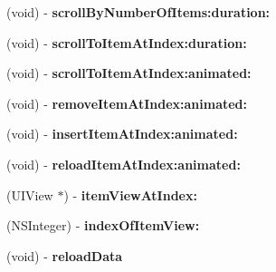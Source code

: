 \begin{DoxyCompactItemize}
\item 
\hypertarget{interfacei_carousel_a70d756ca9733de264576ad1609b0670c}{(void) -\/ {\bfseries scroll\-By\-Number\-Of\-Items\-:duration\-:}}\label{interfacei_carousel_a70d756ca9733de264576ad1609b0670c}

\item 
\hypertarget{interfacei_carousel_a317c3bf4ceb4d0621ee6727dfdd611a1}{(void) -\/ {\bfseries scroll\-To\-Item\-At\-Index\-:duration\-:}}\label{interfacei_carousel_a317c3bf4ceb4d0621ee6727dfdd611a1}

\item 
\hypertarget{interfacei_carousel_abae537074eab49ea3ec5c4cc33b49c12}{(void) -\/ {\bfseries scroll\-To\-Item\-At\-Index\-:animated\-:}}\label{interfacei_carousel_abae537074eab49ea3ec5c4cc33b49c12}

\item 
\hypertarget{interfacei_carousel_a7a5514e7ef0d9eb5ebb453a0a61b44de}{(void) -\/ {\bfseries remove\-Item\-At\-Index\-:animated\-:}}\label{interfacei_carousel_a7a5514e7ef0d9eb5ebb453a0a61b44de}

\item 
\hypertarget{interfacei_carousel_a46a2e5d4ed6e043855252f2621c9d89b}{(void) -\/ {\bfseries insert\-Item\-At\-Index\-:animated\-:}}\label{interfacei_carousel_a46a2e5d4ed6e043855252f2621c9d89b}

\item 
\hypertarget{interfacei_carousel_a0677279abc3188c434f825970eea06eb}{(void) -\/ {\bfseries reload\-Item\-At\-Index\-:animated\-:}}\label{interfacei_carousel_a0677279abc3188c434f825970eea06eb}

\item 
\hypertarget{interfacei_carousel_a90df60ca7e6ff4ad1c654d54d7ef4f49}{(U\-I\-View $\ast$) -\/ {\bfseries item\-View\-At\-Index\-:}}\label{interfacei_carousel_a90df60ca7e6ff4ad1c654d54d7ef4f49}

\item 
\hypertarget{interfacei_carousel_aa2017ad3deb8cd0c5ad89b8f97a29bbb}{(N\-S\-Integer) -\/ {\bfseries index\-Of\-Item\-View\-:}}\label{interfacei_carousel_aa2017ad3deb8cd0c5ad89b8f97a29bbb}

\item 
\hypertarget{interfacei_carousel_a876975b04d95417e794eda30876185ce}{(void) -\/ {\bfseries reload\-Data}}\label{interfacei_carousel_a876975b04d95417e794eda30876185ce}

\end{DoxyCompactItemize}
